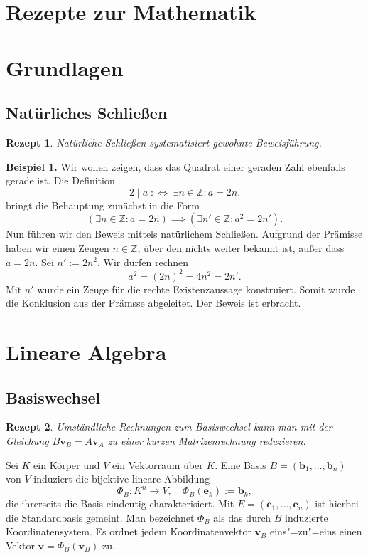 \documentclass[a4paper,10pt,fleqn,twocolumn,twoside,dvipdfmx]{scrartcl}
\theoremstyle{rmbox}
\newtheorem{Rezept}{Rezept}[section]
\newcommand{\strong}[1]{\textsf{\textbf{#1}}}
\newcommand{\bv}[1]{\mathbf{#1}}
\newcommand{\Z}{\mathbb Z}
\newcommand{\defiff}{\;:\Longleftrightarrow\;}
\begin{document}
\thispagestyle{empty}

\section*{\LARGE Rezepte zur Mathematik}

\tableofcontents

\clearpage
\section{Grundlagen}

\subsection{Natürliches Schließen}

\begin{Rezept}
Natürliche Schließen systematisiert gewohnte Beweisführung.
\end{Rezept}
\strong{Beispiel 1.}
Wir wollen zeigen, dass das Quadrat einer geraden Zahl ebenfalls
gerade ist. Die Definition
\[2\mid a \defiff \exists n\in\Z\colon a = 2n.\]
bringt die Behauptung zunächst in die Form
\[(\exists n\in\Z\colon a = 2n) \implies (\exists n'\in\Z\colon a^2 = 2n').\]
Nun führen wir den Beweis mittels natürlichem Schließen. Aufgrund
der Prämisse haben wir einen Zeugen $n\in\Z$, über den nichts
weiter bekannt ist, außer dass $a=2n$. Sei $n':=2n^2$. Wir dürfen
rechnen
\[a^2 = (2n)^2 = 4n^2 = 2n'.\]
Mit $n'$ wurde ein Zeuge für die rechte Existenzaussage konstruiert.
Somit wurde die Konklusion aus der Prämsse abgeleitet. Der Beweis
ist erbracht.

\section{Lineare Algebra}

\subsection{Basiswechsel}

\begin{Rezept}
Umständliche Rechnungen zum Basiswechsel kann man mit der
Gleichung $B\bv v_B = A\bv v_A$ zu einer kurzen Matrizenrechnung
reduzieren.
\end{Rezept}

\noindent
Sei $K$ ein Körper und $V$ ein Vektorraum über $K$.
Eine Basis $B=(\bv b_1,\ldots, \bv b_n)$ von $V$ induziert die
bijektive lineare Abbildung
\[\Phi_B\colon K^n\to V,\quad \Phi_B(\bv e_k) := \bv b_k,\]
die ihrerseits die Basis eindeutig charakterisiert. Mit
$E=(\bv e_1,\ldots,\bv e_n)$ ist hierbei die Standardbasis gemeint.
Man bezeichnet $\Phi_B$ als das durch $B$ induzierte Koordinatensystem.
Es ordnet jedem Koordinatenvektor $\bv v_B$ eins"=zu"=eins einen Vektor
$\bv v = \Phi_B(\bv v_B)$ zu.
\end{document}
